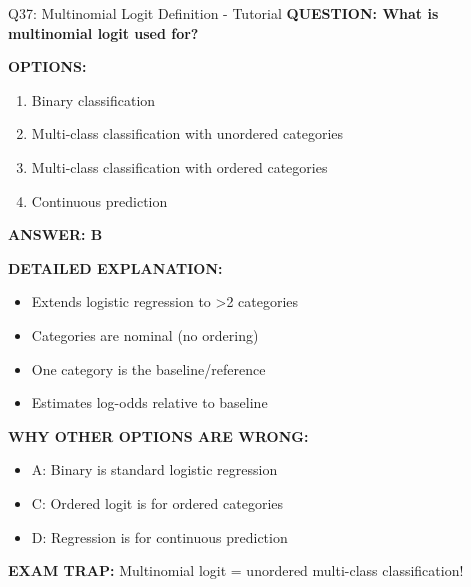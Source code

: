 \documentclass[8pt]{beamer}
\begin{document}
	\begin{frame}{Q37: Multinomial Logit Definition - Tutorial}
		\fontsize{6.5}{7.5}\selectfont
		\textbf{QUESTION: What is multinomial logit used for?}
		
		\vspace{0.1cm}
		\textbf{OPTIONS:}
		\begin{enumerate}
			\item Binary classification
			\item Multi-class classification with unordered categories
			\item Multi-class classification with ordered categories
			\item Continuous prediction
		\end{enumerate}
		
		\vspace{0.1cm}
		\textcolor{myblue}{\textbf{ANSWER: B}}
		
		\vspace{0.1cm}
		\textbf{DETAILED EXPLANATION:}
		\begin{itemize}
			\item Extends logistic regression to >2 categories
			\item Categories are nominal (no ordering)
			\item One category is the baseline/reference
			\item Estimates log-odds relative to baseline
		\end{itemize}
		
		\vspace{0.1cm}
		\textcolor{myred}{\textbf{WHY OTHER OPTIONS ARE WRONG:}}
		\begin{itemize}
			\item \textcolor{myred}{A:} Binary is standard logistic regression
			\item \textcolor{myred}{C:} Ordered logit is for ordered categories
			\item \textcolor{myred}{D:} Regression is for continuous prediction
		\end{itemize}
		
		\textcolor{myred}{\textbf{EXAM TRAP:}} Multinomial logit = \textcolor{myblue}{unordered multi-class classification}!
	\end{frame}
	
\end{document}
